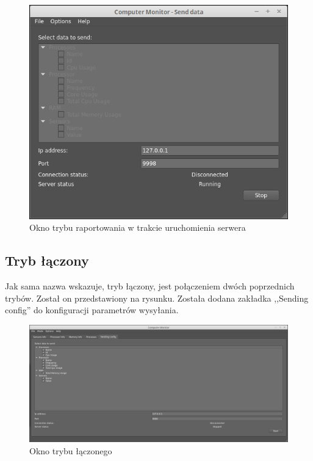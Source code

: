 \documentclass[a4paper]{article}
\begin{document}
\begin{figure}[H]
	\centering
	\includegraphics[height=0.25\paperheight]{img/oknoTrybuRaportowania.png}
	\caption{Okno trybu raportowania w trakcie uruchomienia serwera}
	\label{okno_trybu_raportowania}
\end{figure}

\subsection{Tryb łączony}

Jak sama nazwa wskazuje, tryb łączony, jest połączeniem dwóch poprzednich trybów. Został on przedstawiony na rysunku. Została dodana zakładka ,,Sending config'' do konfiguracji parametrów wysyłania.

\begin{figure}[H]
	\centering
	\includegraphics[height=0.25\paperheight]{img/oknoTrybuLaczonego.png}
	\caption{Okno trybu łączonego}
	\label{okno_trybu_laczonego}
\end{figure}
\end{document}
